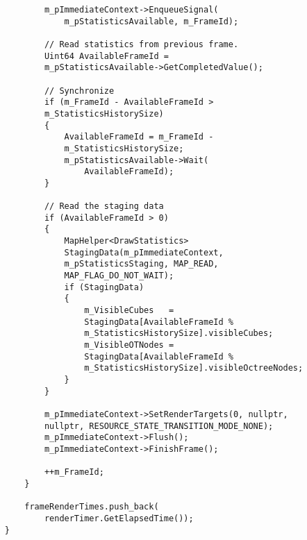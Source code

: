 \begin{lstlisting}
            m_pImmediateContext->EnqueueSignal(
                m_pStatisticsAvailable, m_FrameId);
    
            // Read statistics from previous frame.
            Uint64 AvailableFrameId = 
            m_pStatisticsAvailable->GetCompletedValue();
    
            // Synchronize
            if (m_FrameId - AvailableFrameId > 
            m_StatisticsHistorySize)
            {
                AvailableFrameId = m_FrameId - 
                m_StatisticsHistorySize;
                m_pStatisticsAvailable->Wait(
                    AvailableFrameId);
            }
    
            // Read the staging data
            if (AvailableFrameId > 0)
            {
                MapHelper<DrawStatistics> 
                StagingData(m_pImmediateContext, 
                m_pStatisticsStaging, MAP_READ, 
                MAP_FLAG_DO_NOT_WAIT);
                if (StagingData)
                {
                    m_VisibleCubes   = 
                    StagingData[AvailableFrameId % 
                    m_StatisticsHistorySize].visibleCubes;
                    m_VisibleOTNodes = 
                    StagingData[AvailableFrameId % 
                    m_StatisticsHistorySize].visibleOctreeNodes;
                }
            }

            m_pImmediateContext->SetRenderTargets(0, nullptr, 
            nullptr, RESOURCE_STATE_TRANSITION_MODE_NONE);
            m_pImmediateContext->Flush();
            m_pImmediateContext->FinishFrame();
            
            ++m_FrameId;
        }

        frameRenderTimes.push_back(
            renderTimer.GetElapsedTime());
    }
\end{lstlisting}